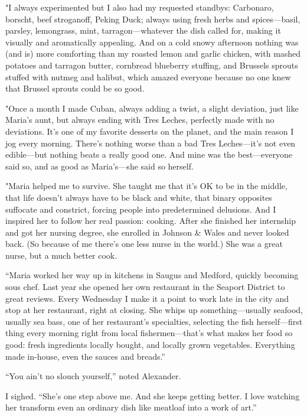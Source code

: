 "I always experimented but I also had my requested standbys: Carbonaro,
borscht, beef stroganoff, Peking Duck; always using fresh herbs and
spices---basil, parsley, lemongrass, mint, tarragon---whatever the dish
called for, making it visually and aromatically appealing. And on a cold
snowy afternoon nothing was (and is) more comforting than my roasted
lemon and garlic chicken, with mashed potatoes and tarragon butter,
cornbread blueberry stuffing, and Brussels sprouts stuffed with nutmeg
and halibut, which amazed everyone because no one knew that Brussel
sprouts could be so good.

"Once a month I made Cuban, always adding a twist, a slight deviation,
just like Maria's aunt, but always ending with Tres Leches, perfectly
made with no deviations. It's one of my favorite desserts on the planet,
and the main reason I jog every morning. There's nothing worse than a
bad Tres Leches---it's not even edible---but nothing beats a really good
one. And mine was the best---everyone said so, and as good as
Maria's---she said so herself.

"Maria helped me to survive. She taught me that it's OK to be in the
middle, that life doesn't always have to be black and white, that binary
opposites suffocate and constrict, forcing people into predetermined
delusions. And I inspired her to follow her real passion: cooking. After
she finished her internship and got her nursing degree, she enrolled in
Johnson \& Wales and never looked back. (So because of me there's one
less nurse in the world.) She was a great nurse, but a much better cook.

``Maria worked her way up in kitchens in Saugus and Medford, quickly
becoming sous chef. Last year she opened her own restaurant in the
Seaport District to great reviews. Every Wednesday I make it a point to
work late in the city and stop at her restaurant, right at closing. She
whips up something---usually seafood, usually sea bass, one of her
restaurant's specialties, selecting the fish herself---first thing every
morning right from local fishermen---that's what makes her food so good:
fresh ingredients locally bought, and locally grown vegetables.
Everything made in-house, even the sauces and breads.''

``You ain't no slouch yourself,'' noted Alexander.

I sighed. ``She's one step above me. And she keeps getting better. I
love watching her transform even an ordinary dish like meatloaf into a
work of art.''

